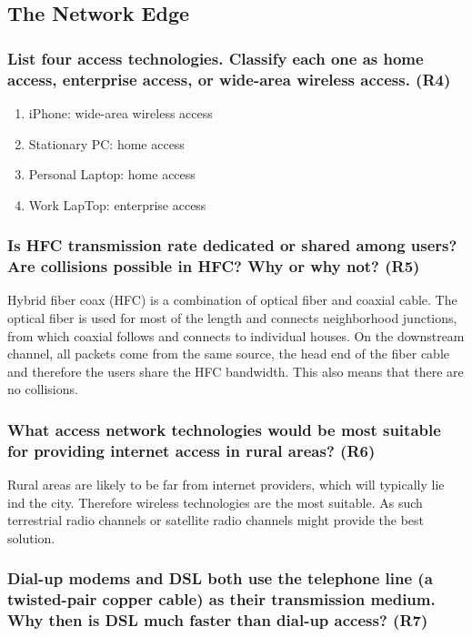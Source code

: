 \subsection{The Network Edge}

\subsubsection{List four access technologies. Classify each one as home access, enterprise access, or wide-area wireless access. (R4)}

\begin{enumerate}
    \item iPhone: wide-area wireless access
    \item Stationary PC: home access
    \item Personal Laptop: home access
    \item Work LapTop: enterprise access
\end{enumerate}



\subsubsection{Is HFC transmission rate dedicated or shared among users? Are collisions possible in HFC? Why or why not? (R5)}
Hybrid fiber coax (HFC) is a combination of optical fiber and coaxial cable. The optical fiber is used for most of the length and connects neighborhood junctions, from which coaxial follows and connects to individual houses. On the downstream channel, all packets come from the same source, the head end of the fiber cable and therefore the users share the HFC bandwidth. This also means that there are no collisions.



\subsubsection{What access network technologies would be most suitable for providing internet access in rural areas? (R6)}
Rural areas are likely to be far from internet providers, which will typically lie ind the city. Therefore wireless technologies are the most suitable. As such terrestrial radio channels or satellite radio channels might provide the best solution.



\subsubsection{Dial-up modems and DSL both use the telephone line (a twisted-pair copper cable) as their transmission medium. Why then is DSL much faster than dial-up access? (R7)}

